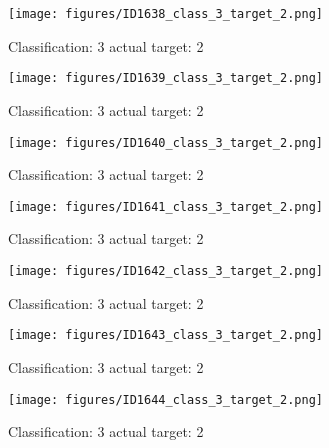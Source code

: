 \begin{figure}[h!]
\begin{center}
\texttt{[image: figures/ID1638\_class\_3\_target\_2.png]}
\end{center}
\caption{ Classification: 3 actual target: 2}
\label{fig:ID1638_class_3_target_2}
\end{figure}
\begin{figure}[h!]
\begin{center}
\texttt{[image: figures/ID1639\_class\_3\_target\_2.png]}
\end{center}
\caption{ Classification: 3 actual target: 2}
\label{fig:ID1639_class_3_target_2}
\end{figure}
\begin{figure}[h!]
\begin{center}
\texttt{[image: figures/ID1640\_class\_3\_target\_2.png]}
\end{center}
\caption{ Classification: 3 actual target: 2}
\label{fig:ID1640_class_3_target_2}
\end{figure}
\begin{figure}[h!]
\begin{center}
\texttt{[image: figures/ID1641\_class\_3\_target\_2.png]}
\end{center}
\caption{ Classification: 3 actual target: 2}
\label{fig:ID1641_class_3_target_2}
\end{figure}
\begin{figure}[h!]
\begin{center}
\texttt{[image: figures/ID1642\_class\_3\_target\_2.png]}
\end{center}
\caption{ Classification: 3 actual target: 2}
\label{fig:ID1642_class_3_target_2}
\end{figure}
\begin{figure}[h!]
\begin{center}
\texttt{[image: figures/ID1643\_class\_3\_target\_2.png]}
\end{center}
\caption{ Classification: 3 actual target: 2}
\label{fig:ID1643_class_3_target_2}
\end{figure}
\begin{figure}[h!]
\begin{center}
\texttt{[image: figures/ID1644\_class\_3\_target\_2.png]}
\end{center}
\caption{ Classification: 3 actual target: 2}
\label{fig:ID1644_class_3_target_2}
\end{figure}
